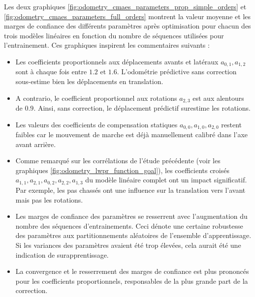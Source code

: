 Les deux graphiques \ref{fig:odometry_cmaes_parameters_prop_simple_orders} et 
\ref{fig:odometry_cmaes_parameters_full_orders} montrent la valeur moyenne et les marges de confiance
des différents paramètres après optimisation pour chacun des trois modèles linéaires en
fonction du nombre de séquences utilisées pour l'entrainement.
Ces graphiques inspirent les commentaires suivants :
\begin{itemize}
    \item Les coefficients proportionnels aux déplacements 
        avants et latéraux $a_{0,1},a_{1,2}$ sont à chaque fois entre $1.2$ et $1.6$. 
        L'odométrie prédictive sans correction sous-estime bien les déplacements
        en translation.
    \item A contrario, le coefficient proportionnel aux rotations $a_{2,3}$ est aux
        alentours de $0.9$. Ainsi, sans correction, le déplacement prédictif surestime 
        les rotations.
    \item Les valeurs des coefficients de compensation statiques $a_{0,0},a_{1,0},a_{2,0}$ 
        restent faibles car le mouvement de marche est déjà manuellement calibré 
        dans l'axe avant arrière.
    \item Comme remarqué sur les corrélations de l'étude précédente 
        (voir les graphiques \ref{fig:odometry_lwpr_function_goal}), les coefficients
        croisés $a_{1,1},a_{2,1},a_{0,2},a_{2,2},a_{1,3}$ du modèle linéaire complet 
        ont un impact significatif.
        Par exemple, les pas chassés ont une influence sur la translation 
        vers l'avant mais pas les rotations.
    \item Les marges de confiance des paramètres se resserrent avec l'augmentation
        du nombre des séquences d'entrainements.
        Ceci dénote une certaine robustesse des paramètres aux partitionnements aléatoires
        de l'ensemble d'apprentissage.
        Si les variances des paramètres avaient été trop élevées, cela aurait été
        une indication de surapprentissage.
    \item La convergence et le resserrement des marges de confiance est plus
        prononcés pour les coefficients proportionnels, responsables de la plus 
        grande part de la correction.\\
\end{itemize}

